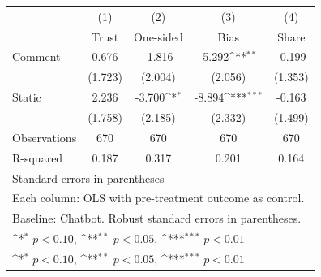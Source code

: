{
\def\sym#1{\ifmmode^{#1}\else\(^{#1}\)\fi}
\begin{tabular}{l*{4}{c}}
\toprule
                    &\multicolumn{1}{c}{(1)}&\multicolumn{1}{c}{(2)}&\multicolumn{1}{c}{(3)}&\multicolumn{1}{c}{(4)}\\
                    &\multicolumn{1}{c}{Trust}&\multicolumn{1}{c}{One-sided}&\multicolumn{1}{c}{Bias}&\multicolumn{1}{c}{Share}\\
\midrule
Comment             &       0.676         &      -1.816         &      -5.292\sym{**} &      -0.199         \\
                    &     (1.723)         &     (2.004)         &     (2.056)         &     (1.353)         \\
\addlinespace
Static              &       2.236         &      -3.700\sym{*}  &      -8.894\sym{***}&      -0.163         \\
                    &     (1.758)         &     (2.185)         &     (2.332)         &     (1.499)         \\
\midrule
Observations        &         670         &         670         &         670         &         670         \\
R-squared           &       0.187         &       0.317         &       0.201         &       0.164         \\
\bottomrule
\multicolumn{5}{l}{\footnotesize Standard errors in parentheses}\\
\multicolumn{5}{l}{\footnotesize Each column: OLS with pre-treatment outcome as control.}\\
\multicolumn{5}{l}{\footnotesize Baseline: Chatbot. Robust standard errors in parentheses.}\\
\multicolumn{5}{l}{\footnotesize \sym{*} \(p<0.10\), \sym{**} \(p<0.05\), \sym{***} \(p<0.01\)}\\
\multicolumn{5}{l}{\footnotesize \sym{*} \(p<0.10\), \sym{**} \(p<0.05\), \sym{***} \(p<0.01\)}\\
\end{tabular}
}
